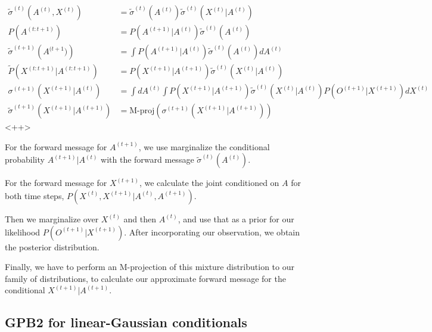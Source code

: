 \documentclass[a4paper]{article}
\begin{document}
\begin{equation}
  \begin{split}
    \tilde{\sigma}^{(t)} \left( A^{(t)}, X^{(t)} \right) &= \tilde{\sigma}^{(t)} \left( A^{(t)} \right) \tilde{\sigma}^{(t)} \left( X^{(t)} \vert A^{(t)} \right) \\
    P\left( A^{(t:t+1)} \right) &= P \left( A^{(t+1)} \vert A^{(t)} \right) \tilde{\sigma}^{(t)} \left( A^{(t)} \right) \\
    \tilde{\sigma}^{(t+1)} \left( A^{(t+1}) \right) &= \int P \left( A^{(t+1)} \vert A^{(t)} \right) \tilde{\sigma}^{(t)} \left( A^{(t)} \right) dA^{(t)} \\
    \tilde{P} \left( X^{(t:t+1)} \vert A^{(t:t+1)} \right) &= P \left(X^{(t+1)} \vert A^{(t+1)} \right) \tilde{\sigma}^{(t)} \left( X^{(t)} \vert A^{(t)} \right) \\
    \sigma^{(t+1)} \left( X^{(t+1)} \vert A^{(t)} \right) &= \int dA^{(t)} \int P \left( X^{(t+1)} \vert A^{(t+1)} \right) \tilde{\sigma}^{(t)} \left( X^{(t)} \vert A^{(t)} \right) P \left( O^{(t+1)} \vert X^{(t+1)} \right) dX^{(t)} \\
    \tilde{\sigma}^{(t+1)} \left( X^{(t+1)} \vert A^{(t+1)} \right) &= \text{M-proj} \left( \sigma^{(t+1)} \left( X^{(t+1)} \vert A^{(t+1)} \right) \right)
  \end{split}
  \label{<++>}
\end{equation}<++>

For the forward message for $A^{(t+1)}$, we use marginalize the conditional probability $A^{(t+1)} \vert A^{(t)}$ with the forward message $\tilde{\sigma}^{(t)} \left( A^{(t)} \right)$.

For the forward message for $X^{(t+1)}$, we calculate the joint conditioned on $A$ for both time steps, $P\left( X^{(t)}, X^{(t+1)} \vert A^{(t)}, A^{(t+1)} \right)$.  

Then we marginalize over $X^{(t)}$ and then $A^{(t)}$, and use that as a prior for our likelihood $P \left( O^{(t+1)} \vert X^{(t+1)} \right)$.  
After incorporating our observation, we obtain the posterior distribution.

Finally, we have to perform an M-projection of this mixture distribution to our family of distributions, to calculate our approximate forward message for the conditional $X^{(t+1)} \vert A^{(t+1)}$.

\subsection{GPB2 for linear-Gaussian conditionals}
\end{document}
